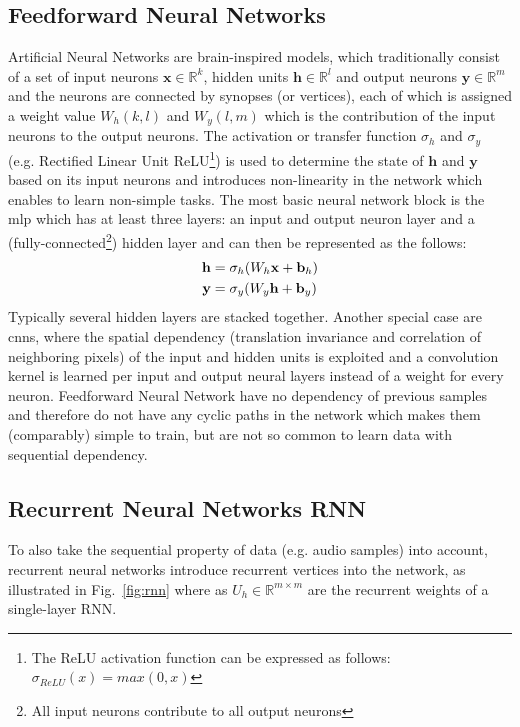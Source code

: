 \subsection{Feedforward Neural Networks}
Artificial Neural Networks are brain-inspired models, which traditionally consist of a set of input neurons $\mathbf{x}\in \mathbb{R}^k $, hidden units $\mathbf{h}\in \mathbb{R}^l$ and output neurons $\mathbf{y}\in \mathbb{R}^m$ and the neurons are connected by synopses (or vertices), each of which is assigned a weight value $W_h(k,l)$  and $W_y(l,m)$ which is the contribution of the input neurons to the output neurons. The activation or transfer function $\sigma_h$ and $\sigma_y$  (e.g. Rectified Linear Unit ReLU\footnote{The ReLU activation function can be expressed as follows: $\sigma_{ReLU}(x)=max(0, x)$}) is used to determine the state of $\mathbf{h}$ and  $\mathbf{y}$ based on its input neurons and introduces non-linearity in the network which enables to learn non-simple tasks. The most basic neural network block is the \gls{mlp} which has at least three layers: an input and output neuron layer and a (fully-connected\footnote{All input neurons contribute to all output neurons}) hidden layer and can then be represented as the follows:
\begin{align*} 
\mathbf{h}&= \sigma_h(W_h\mathbf{x}+\mathbf{b}_h)\\
\mathbf{y}&= \sigma_y(W_y\mathbf{h}+\mathbf{b}_y)
\end{align*}
Typically several hidden layers are stacked together. Another special case are \glspl{cnn}, where the spatial dependency (translation invariance and correlation of neighboring pixels) of the input and hidden units is exploited and a convolution kernel is learned per input and output neural layers instead of a weight for every neuron.
Feedforward Neural Network have no dependency of previous samples and therefore do not have any cyclic paths in the network which makes them (comparably) simple to train, but are not so common to learn data with sequential dependency.

\subsection{Recurrent Neural Networks RNN}
To also take the sequential property of data (e.g. audio samples) into account, recurrent neural networks introduce recurrent vertices into the network, as illustrated in Fig.~\ref{fig:rnn} where as $U_{h}\in \mathbb{R}^{m\times m}$ are the recurrent weights of a single-layer RNN.

